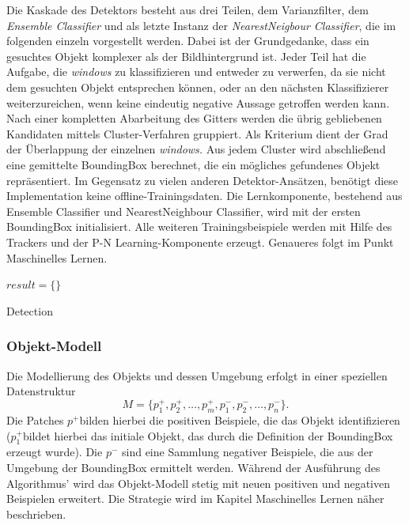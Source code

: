 	Die Kaskade des Detektors besteht aus drei Teilen, dem Varianzfilter, dem \textit{Ensemble Classifier} und als letzte Instanz der \textit{NearestNeigbour Classifier}, die im folgenden einzeln vorgestellt werden. Dabei ist der Grundgedanke, dass ein gesuchtes Objekt komplexer als der Bildhintergrund ist. Jeder Teil hat die Aufgabe, die \textit{windows} zu klassifizieren und entweder zu verwerfen, da sie nicht dem gesuchten Objekt entsprechen können, oder an den nächsten Klassifizierer weiterzureichen, wenn keine eindeutig negative Aussage getroffen werden kann. Nach einer kompletten Abarbeitung des Gitters werden die übrig gebliebenen Kandidaten mittels Cluster-Verfahren gruppiert. Als Kriterium dient der Grad der Überlappung der einzelnen \textit{windows.} Aus jedem Cluster wird abschließend eine gemittelte BoundingBox berechnet, die ein mögliches gefundenes Objekt repräsentiert. Im Gegensatz zu vielen anderen Detektor-Ansätzen, benötigt diese Implementation keine offline-Trainingsdaten. Die Lernkomponente, bestehend aus Ensemble Classifier und NearestNeighbour Classifier, wird mit der ersten BoundingBox initialisiert. Alle weiteren Trainingsbeispiele werden mit Hilfe des Trackers und der P-N Learning-Komponente erzeugt. Genaueres folgt im Punkt Maschinelles Lernen.

	\begin{algorithm}
	\vspace{0.2cm}
	$result = \{\}$\;
	\caption{Detection}
	\label{alg:detection}
	\vspace{0.2cm}
	\end{algorithm}

	\subsubsection{Objekt-Modell}
	Die Modellierung des Objekts und dessen Umgebung erfolgt in einer speziellen Datenstruktur
	\begin{equation}
	M=\{p_{1}^{+},p_{2}^{+},\dots,p_{m}^{+},p_{1}^{-},p_{2}^{-},\dots,p_{n}^{-}\}.
	\end{equation}
	Die Patches $p^{+}$bilden hierbei die positiven Beispiele, die das Objekt identifizieren ($p_{1}^{+}$bildet hierbei das initiale Objekt, das durch die Definition der BoundingBox erzeugt wurde). Die $p^{-}$ sind eine Sammlung negativer Beispiele, die aus der Umgebung der BoundingBox ermittelt werden. Während der Ausführung des Algorithmus' wird das Objekt-Modell stetig mit neuen positiven und negativen Beispielen erweitert. Die Strategie wird im Kapitel Maschinelles Lernen näher beschrieben.

